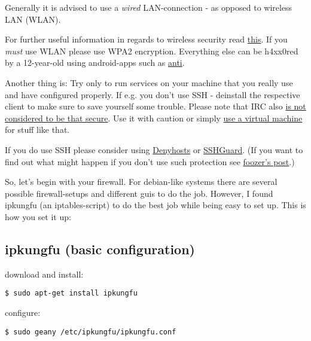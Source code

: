 \documentclass{article}
\begin{document}
 Generally it is advised to use a \emph{wired} LAN-connection - as opposed to wireless LAN (WLAN).

For further useful information in regards to wireless security read \href{http://backtrack-linux.org/forums/showthread.php?t=2120}{this}. If you \emph{must} use WLAN please use WPA2 encryption. Everything else can be h4xx0red by a 12-year-old using android-apps such as \href{http://youtu.be/tKW-XV59-gk}{anti}.


 Another thing is: Try only to run services on your machine that you really use and have configured properly. If e.g. you don't use SSH - deinstall the respective client to make sure to save yourself some trouble. Please note that IRC also \href{http://forums.hak5.org/index.php?/topic/26595-irc-hacking-in-2012/#entry203408}{is not considered to be that secure}. Use it with caution or simply \href{http://youtu.be/zLJbP6vBk2M}{use a virtual machine} for stuff like that. 


 If you do use SSH please consider using \href{http://www.tomschaefer.org/wiki/index.php/Install_Denyhosts}{Denyhosts} or \href{http://www.sshguard.net/}{SSHGuard}. (If you want to find out what might happen if you don't use such protection see \href{http://crunchbang.org/forums/viewtopic.php?id=24768}{foozer's post}.)


 So, let's begin with your firewall. For debian-like systems there are several possible firewall-setups and different guis to do the job. However, I found ipkungfu (an iptables-script) to do the best job while being easy to set up. This is how you set it up: 
\subsection{ipkungfu (basic configuration)}


 download and install:
\begin{lstlisting}
$ sudo apt-get install ipkungfu
\end{lstlisting}



 configure:
\begin{lstlisting}
$ sudo geany /etc/ipkungfu/ipkungfu.conf
\end{lstlisting}
\end{document}
